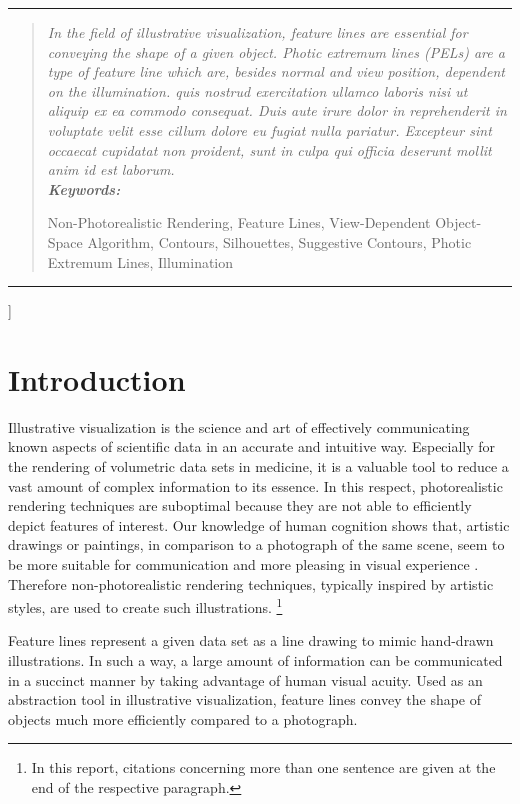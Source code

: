 \documentclass[9pt,fleqn,twoside,twocolumn]{stdglobal}
\begin{document}
{\begin{@twocolumnfalse}
\begin{center}
  \end{center}
  \vspace{2em}
  \hrule
  \begin{abstract}
    \itshape
    \noindent
    In the field of illustrative visualization, feature lines are essential for conveying the shape of a given object.
    Photic extremum lines (PELs) are a type of feature line which are, besides normal and view position, dependent on the illumination.
    quis nostrud exercitation ullamco laboris nisi ut aliquip ex ea commodo
    consequat. Duis aute irure dolor in reprehenderit in voluptate velit esse
    cillum dolore eu fugiat nulla pariatur. Excepteur sint occaecat cupidatat non
    proident, sunt in culpa qui officia deserunt mollit anim id est laborum.
    \\

    \noindent
    \textbf{Keywords:}
    \parbox[t]{0.8\textwidth}{Non-Photorealistic Rendering, Feature Lines, View-Dependent Object-Space Algorithm, Contours, Silhouettes, Suggestive Contours, Photic Extremum Lines, Illumination}
  \end{abstract}
  \hrule
  \vspace{3em}
\end{@twocolumnfalse}}]

\section{Introduction}
  Illustrative visualization is the science and art of effectively communicating known aspects of scientific data in an accurate and intuitive way.
  Especially for the rendering of volumetric data sets in medicine, it is a valuable tool to reduce a vast amount of complex information to its essence.
  In this respect, photorealistic rendering techniques are suboptimal because they are not able to efficiently depict features of interest.
  Our knowledge of human cognition shows that, artistic drawings or paintings, in comparison to a photograph of the same scene, seem to be more suitable for communication and more pleasing in visual experience \autocite{xie2007}.
  Therefore non-photorealistic rendering techniques, typically inspired by artistic styles, are used to create such illustrations.
  \autocite{viola2005}%
  \footnote{In this report, citations concerning more than one sentence are given at the end of the respective paragraph.}

  Feature lines represent a given data set as a line drawing to mimic hand-drawn illustrations.
  In such a way, a large amount of information can be communicated in a succinct manner by taking advantage of human visual acuity.
  Used as an abstraction tool in illustrative visualization, feature lines convey the shape of objects much more efficiently compared to a photograph.
  \autocite{xie2007,isenberg2003,viola2005}
\end{document}
